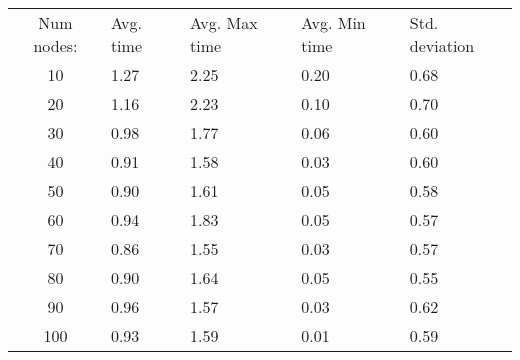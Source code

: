 \begin{tabular}{cllll}
Num nodes: & Avg. time & Avg. Max time & Avg. Min time & Std. deviation \\
10       & 1.27        & 2.25            & 0.20 & 0.68 \\
20       & 1.16        & 2.23            & 0.10 & 0.70 \\
30       & 0.98        & 1.77            & 0.06 & 0.60 \\
40       & 0.91        & 1.58            & 0.03 & 0.60 \\
50       & 0.90        & 1.61            & 0.05 & 0.58 \\
60       & 0.94        & 1.83            & 0.05 & 0.57 \\
70       & 0.86        & 1.55            & 0.03 & 0.57 \\
80       & 0.90        & 1.64            & 0.05 & 0.55 \\
90       & 0.96        & 1.57            & 0.03 & 0.62 \\
100       & 0.93        & 1.59            & 0.01 & 0.59 \\
\end{tabular}